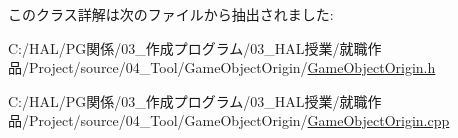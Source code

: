 このクラス詳解は次のファイルから抽出されました\+:\begin{DoxyCompactItemize}
\item 
C\+:/\+H\+A\+L/\+P\+G関係/03\+\_\+作成プログラム/03\+\_\+\+H\+A\+L授業/就職作品/\+Project/source/04\+\_\+\+Tool/\+Game\+Object\+Origin/\mbox{\hyperlink{_game_object_origin_8h}{Game\+Object\+Origin.\+h}}\item 
C\+:/\+H\+A\+L/\+P\+G関係/03\+\_\+作成プログラム/03\+\_\+\+H\+A\+L授業/就職作品/\+Project/source/04\+\_\+\+Tool/\+Game\+Object\+Origin/\mbox{\hyperlink{_game_object_origin_8cpp}{Game\+Object\+Origin.\+cpp}}\end{DoxyCompactItemize}
